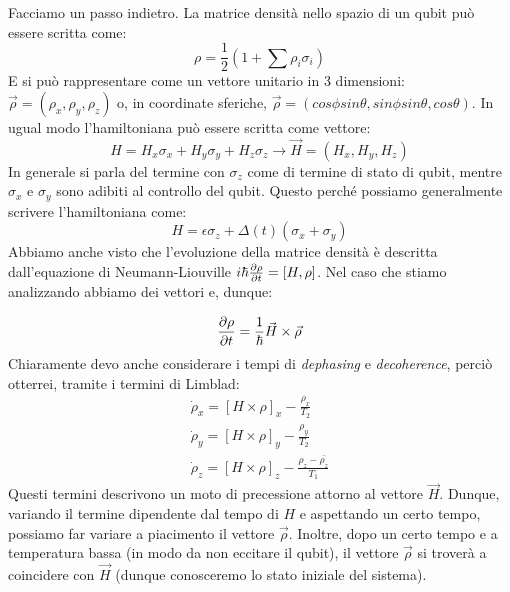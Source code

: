 Facciamo un passo indietro. La matrice densità nello spazio di un qubit può essere scritta come:
\begin{equation*}
   \rho=\frac{1}{2}(1+\sum\rho_i\sigma_i)
\end{equation*}
E si può rappresentare come un vettore unitario in 3 dimensioni: $\vec\rho=(\rho_x,\rho_y,\rho_z)$ o, in coordinate sferiche, $\vec\rho=(cos\phi sin\theta,sin\phi sin\theta,cos\theta)$.
In ugual modo l'hamiltoniana può essere scritta come vettore:
\begin{equation*}
   H = H_x \sigma_x +  H_y \sigma_y  +  H_z \sigma_z \rightarrow \vec H = \left( H_x , H_y , H_z \right)
\end{equation*}
In generale si parla del termine con $\sigma_z$ come di termine di stato di qubit, mentre $\sigma_x$ e $\sigma_y$ sono adibiti al controllo del qubit. Questo perché possiamo generalmente scrivere l'hamiltoniana come:
\begin{equation*}
    H = \epsilon\sigma_z+\Delta(t)(\sigma_x+\sigma_y)
\end{equation*}
Abbiamo anche visto che l'evoluzione della matrice densità è descritta dall'equazione di Neumann-Liouville $i\hbar \partialderivative{\rho}{t} = \left[ H, \rho\right]$. Nel caso che stiamo analizzando abbiamo dei vettori e, dunque:

\begin{equation*}
 \partialderivative{\rho}{t}=\frac{1}{\hbar}\vec H\times\vec\rho
\end{equation*}
Chiaramente devo anche considerare i tempi di \textit{dephasing} e \textit{decoherence}, perciò otterrei, tramite i termini di Limblad:
\begin{align*}
    \dot\rho_x=[H\times\rho]_x-\frac{\rho_x}{T_2}  \\
    \dot\rho_y=[H\times\rho]_y-\frac{\rho_y}{T_2}   \\
    \dot\rho_z=[H\times\rho]_z-\frac{\rho_z-\bar{\rho_z}}{T_1}   
\end{align*}
Questi termini descrivono un moto di precessione attorno al vettore $\vec H$. Dunque, variando il termine dipendente dal tempo di $H$ e aspettando un certo tempo, possiamo far variare a piacimento il vettore $\vec \rho$.
Inoltre, dopo un certo tempo e a temperatura bassa (in modo da non eccitare il qubit), il vettore $\vec \rho$ si troverà a coincidere con $\vec H$ (dunque conosceremo lo stato iniziale del sistema). 

